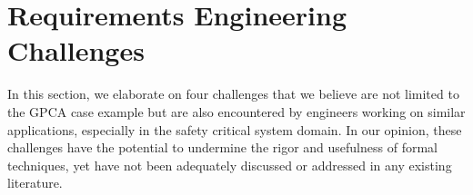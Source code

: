 \section{Requirements Engineering Challenges}
\label{sec:challenge}

In this section, we elaborate on four challenges that we believe are not limited to the GPCA case example but are also encountered by engineers working on similar applications, especially in the safety critical system domain. In our opinion, these challenges have the potential to undermine the rigor and usefulness of formal techniques, yet have not been adequately discussed or addressed in any existing literature.



